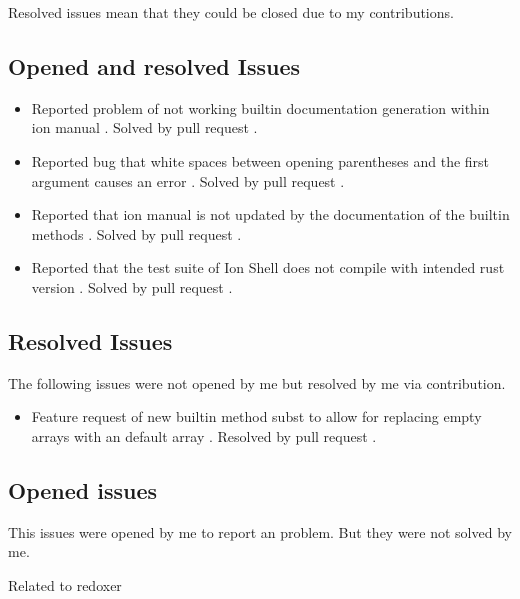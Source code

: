 Resolved issues mean that they could be closed due to my contributions.

\subsection{Opened and resolved Issues}

\begin{itemize}
	\item Reported problem of not working builtin documentation generation within ion manual \cite{issue_builtin_generation}. Solved by pull request \cite{pr_man_history_included_ion_manual}.
	\item Reported bug that white spaces between opening parentheses and the first argument causes an error \cite{issue_spaces_between_opening_parentheses}. Solved by pull request \cite{issue_spaces_between_opening_parentheses}.
	\item Reported that ion manual is not updated by the documentation of the builtin methods \cite{issue_ion_manual_not_updated}. Solved by pull request \cite{pr_subst_method}.
	\item Reported that the test suite of Ion Shell does not compile with intended rust version \cite{issue_bug_test_not_compile}. Solved by pull request \cite{pr_conf_partial_ci_fix}.
\end{itemize}

\subsection{Resolved Issues}

The following issues were not opened by me but resolved by me via contribution.

\begin{itemize}
	\item Feature request of new builtin method subst to allow for replacing empty arrays with an default array \cite{issue_subst_request}. Resolved by pull request \cite{pr_subst_method}.

\end{itemize}

\subsection{Opened issues}

This issues were opened by me to report an problem. But they were not solved by me.

Related to \gls{redoxer}

